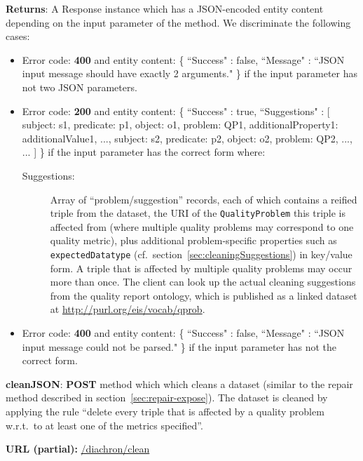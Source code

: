 \begin{description}
\begin{itemize}
\end{itemize}
\textbf{Returns}: A Response instance which has a JSON-encoded entity content depending on the input parameter of the method. We discriminate the following cases: 
\begin{itemize}
\item Error code: \textbf{400} and entity content: \{ ``Success" : false, ``Message" : ``JSON input message should have exactly 2 arguments." \} if the input parameter has not two JSON parameters. 
\item Error code: \textbf{200} and entity content: 
\{ ``Success" : true,  
``Suggestions" : [ { subject: s1, predicate: p1, object: o1, problem: QP1, additionalProperty1: additionalValue1, ...}, 
{ subject: s2, predicate: p2, object: o2, problem: QP2, ...}, ...
] \} 
if the input parameter has the correct form where:
\begin{description}
\item [Suggestions:] Array of ``problem/suggestion'' records, each of which contains a reified triple from the dataset, the URI of the \texttt{QualityProblem} this triple is affected from (where multiple quality problems may correspond to one quality metric), plus additional problem-specific properties such as \texttt{expectedDatatype} (cf.\ section~\ref{sec:cleaningSuggestions}) in key/value form.
A triple that is affected by multiple quality problems may occur more than once.
The client can look up the actual cleaning suggestions from the quality report ontology, which is published as a linked dataset at \url{http://purl.org/eis/vocab/qprob}.
\end{description} 
\item Error code: \textbf{400} and entity content: \{ ``Success" : false, ``Message" : ``JSON input message could not be parsed." \} if the input parameter has not the correct form. 
\end{itemize}

\item{\textbf{cleanJSON}:} \textbf{POST} method which which cleans a dataset (similar to the repair method described in section~\ref{sec:repair-expose}).
The dataset is cleaned by applying the rule ``delete every triple that is affected by a quality problem w.r.t.\ to at least one of the metrics specified''.

\textbf{URL (partial):} \url{/diachron/clean} 


\end{description}

